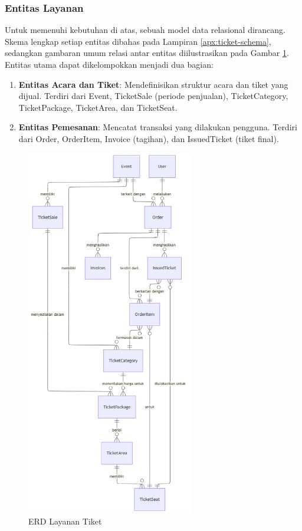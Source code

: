 \subsubsection{Entitas Layanan}

Untuk memenuhi kebutuhan di atas, sebuah model data relasional dirancang. Skema lengkap setiap entitas dibahas pada Lampiran \ref{apx:ticket-schema}, sedangkan gambaran umum relasi antar entitas diilustrasikan pada Gambar \ref{fig:erd-ticket-service}. Entitas utama dapat dikelompokkan menjadi dua bagian:
\begin{enumerate}
    \item \textbf{Entitas Acara dan Tiket}: Mendefinisikan struktur acara dan tiket yang dijual. Terdiri dari Event, TicketSale (periode penjualan), TicketCategory, TicketPackage, TicketArea, dan TicketSeat.
    \item \textbf{Entitas Pemesanan}: Mencatat transaksi yang dilakukan pengguna. Terdiri dari Order, OrderItem, Invoice (tagihan), dan IssuedTicket (tiket final).
\end{enumerate}

\begin{figure}[H]
    \centering
    \includegraphics[width=0.65\textwidth]{resources/chapter-3/erd-mini.png}
    \caption{ERD Layanan Tiket}
    \label{fig:erd-ticket-service}
\end{figure}

